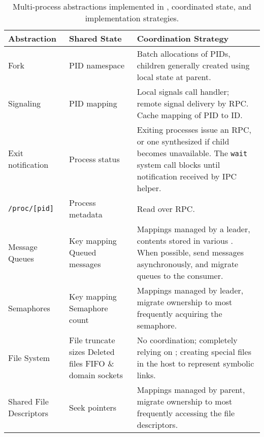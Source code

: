 \begin{table}
\footnotesize
\centering
\begin{tabular}{|p{}|p{}|p{}|}
\hline
{\bf Ab\-strac\-tion} & {\bf Shared State} & {\bf Coordination Strategy} \\
\hline
Fork & 
\raggedright
PID namespace & Batch allocations of PIDs, children generally created using local state at parent.  \\
\hline
Signaling & PID mapping & Local signals call handler; remote signal delivery by RPC.  Cache mapping of PID to \picoproc{} ID. \\
\hline
\raggedright
Exit notification & 
\raggedright
Process status  & Exiting processes issue an RPC, or one synthesized if child becomes unavailable.  The {\tt wait} system call blocks until notification received by IPC helper. \\
\hline
{\tt /proc/[pid]} & Process metadata & Read over RPC.  \\
\hline
Message Queues & 
\raggedright
Key mapping \newline
Queued messages &
Mappings managed by a leader, contents stored in various \picoprocs{}.  When possible, send messages asynchronously, and migrate queues to the consumer.\\
\hline
Semaphores & 
\raggedright
Key mapping \newline
Semaphore count &
Mappings managed by leader, migrate ownership to \picoproc{} most frequently acquiring the semaphore. \\
\hline
\raggedright
File System & 
\raggedright
File truncate sizes \newline
Deleted files \newline
FIFO \& domain sockets
& No coordination; completely relying on \thehostabi{}; creating special files in the host to represent symbolic links. \\
\hline
\raggedright
Shared File Descriptors & 
\raggedright
Seek pointers & Mappings managed by parent, migrate ownership to \picoproc{} most frequently accessing the file descriptors. \\
\hline
\end{tabular}
\caption[Multi-process abstractions implemented in sysname{}]
{Multi-process abstractions implemented in \graphene{}, coordinated state, and implementation strategies.}
\label{tab:libos:multiproc}
\end{table}



